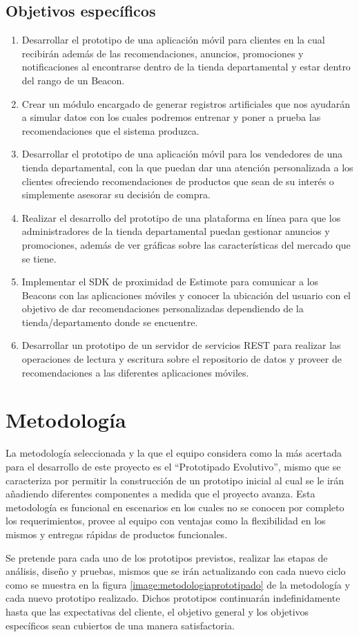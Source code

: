 \subsection{Objetivos específicos}
\begin{enumerate}[1.]
    \item Desarrollar el prototipo de una aplicación móvil para clientes en la cual recibirán además de las recomendaciones, anuncios, promociones y notificaciones al encontrarse dentro de la tienda departamental y estar dentro del rango de un Beacon.
    \item Crear un módulo encargado de generar registros artificiales que nos ayudarán a simular datos con los cuales podremos entrenar y poner a prueba las recomendaciones que el sistema produzca. 
    \item Desarrollar el prototipo de una aplicación móvil para los vendedores de una tienda departamental, con la que puedan dar una atención personalizada a los clientes ofreciendo recomendaciones de productos que sean de su interés o simplemente asesorar su decisión de compra. 
    \item Realizar el desarrollo del prototipo de una plataforma en línea para que los administradores de la tienda departamental puedan gestionar anuncios y promociones, además de ver gráficas sobre las características del mercado que se tiene.
    \item Implementar el SDK de proximidad de Estimote para comunicar a los Beacons con las aplicaciones móviles y conocer la ubicación del usuario con el objetivo de dar recomendaciones personalizadas dependiendo de la tienda/departamento donde se encuentre.
    \item Desarrollar un prototipo de un servidor de servicios REST para realizar las operaciones de lectura y escritura sobre el repositorio de datos y proveer de recomendaciones a las diferentes aplicaciones móviles. 
\end{enumerate}
\section{Metodología}
La metodología seleccionada y la que el equipo considera como la más acertada para el desarrollo de este proyecto es el “Prototipado Evolutivo”, mismo que se caracteriza por permitir la construcción de un prototipo inicial al cual se le irán añadiendo diferentes componentes a medida que el proyecto avanza. Esta metodología  es funcional en escenarios en los cuales no se conocen por completo los requerimientos, provee al equipo con ventajas como la flexibilidad en los mismos y entregas rápidas de productos funcionales.
\\ \par
Se pretende para cada uno de los prototipos previstos, realizar las etapas de análisis, diseño y pruebas, mismos que se irán actualizando con cada nuevo ciclo como se muestra en la figura \ref{image:metodologiaprototipado} de la metodología y cada nuevo prototipo realizado. Dichos prototipos continuarán indefinidamente hasta que las expectativas del cliente, el objetivo general y los objetivos específicos sean cubiertos de una manera satisfactoria. 

